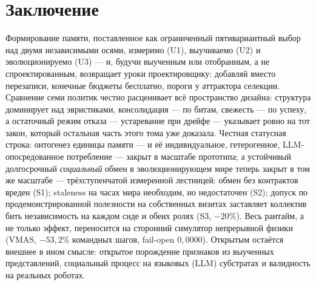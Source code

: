 \documentclass{article}
\begin{document}
\section{Заключение}

Формирование памяти, поставленное как ограниченный пятивариантный
выбор над двумя независимыми осями, измеримо (U1), выучиваемо (U2) и
эволюционируемо (U3) --- и, будучи выученным или отобранным, а не
спроектированным, возвращает уроки проектировщику: добавляй вместо
перезаписи, конечные бюджеты бесплатно, пороги у аттрактора селекции.
Сравнение семи политик честно расценивает всё пространство дизайна:
структура доминирует над эвристиками, консолидация --- по битам,
свежесть --- по успеху, а остаточный режим отказа --- устаревание при
дрейфе --- указывает ровно на тот закон, который остальная часть
этого тома уже доказала. Честная статусная строка: онтогенез единицы
памяти --- и её индивидуальное, гетерогенное, LLM-опосредованное
потребление --- закрыт в масштабе прототипа; а устойчивый долгосрочный
\emph{социальный} обмен в эволюционирующем мире теперь закрыт в том
же масштабе --- трёхступенчатой измеренной лестницей: обмен без
контрактов вреден (S1); staleness на часах мира необходим, но
недостаточен (S2); допуск по продемонстрированной полезности на
собственных визитах заставляет коллектив бить независимость на
каждом сиде и обеих ролях (S3, $-20\%$). Весь рантайм, а не только
эффект, переносится на сторонний симулятор непрерывной физики (VMAS,
$-53{,}2\%$ командных шагов, fail-open $0{,}0000$). Открытым остаётся
внешнее в ином смысле: открытое порождение признаков из выученных
представлений, социальный процесс на языковых (LLM) субстратах и
валидность на реальных роботах.
\end{document}
